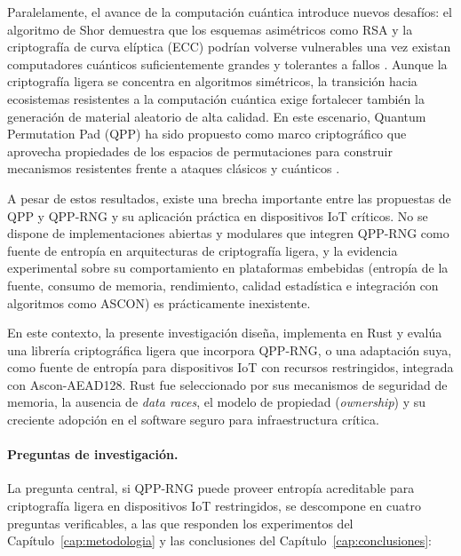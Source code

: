 Paralelamente, el avance de la computación cuántica introduce nuevos desafíos: el algoritmo de Shor demuestra que los esquemas asimétricos como RSA y la criptografía de curva elíptica (ECC) podrían volverse vulnerables una vez existan computadores cuánticos suficientemente grandes y tolerantes a fallos \cite{Shor1994AlgorithmsFactoring}. Aunque la criptografía ligera se concentra en algoritmos simétricos, la transición hacia ecosistemas resistentes a la computación cuántica exige fortalecer también la generación de material aleatorio de alta calidad. En este escenario, Quantum Permutation Pad (QPP) ha sido propuesto como marco criptográfico que aprovecha propiedades de los espacios de permutaciones para construir mecanismos resistentes frente a ataques clásicos y cuánticos \cite{Kuang2022QuantumCryptography,Kuang2020ShannonSpace}.

A pesar de estos resultados, existe una brecha importante entre las propuestas de QPP y QPP-RNG y su aplicación práctica en dispositivos IoT críticos. No se dispone de implementaciones abiertas y modulares que integren QPP-RNG como fuente de entropía en arquitecturas de criptografía ligera, y la evidencia experimental sobre su comportamiento en plataformas embebidas (entropía de la fuente, consumo de memoria, rendimiento, calidad estadística e integración con algoritmos como ASCON) es prácticamente inexistente.

En este contexto, la presente investigación diseña, implementa en Rust y evalúa una librería criptográfica ligera que incorpora QPP-RNG, o una adaptación suya, como fuente de entropía para dispositivos IoT con recursos restringidos, integrada con Ascon-AEAD128. Rust fue seleccionado por sus mecanismos de seguridad de memoria, la ausencia de \textit{data races}, el modelo de propiedad (\textit{ownership}) y su creciente adopción en el software seguro para infraestructura crítica.

\paragraph{Preguntas de investigación.} La pregunta central, si QPP-RNG puede proveer entropía acreditable para criptografía ligera en dispositivos IoT restringidos, se descompone en cuatro preguntas verificables, a las que responden los experimentos del Capítulo~\ref{cap:metodologia} y las conclusiones del Capítulo~\ref{cap:conclusiones}:

